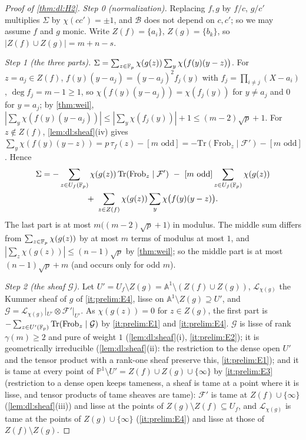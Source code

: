 \begin{proof}[Proof of \cref{thm:dl:H2}]
\emph{Step 0 (normalization).} Replacing $f,g$ by $f/c$, $g/c'$ multiplies
$\Sigma$ by $\chi(cc')=\pm1$, and $\mathcal B$ does not depend on $c,c'$; so we
may assume $f$ and $g$ monic. Write $Z(f)=\{a_i\}$, $Z(g)=\{b_k\}$, so
$|Z(f)\cup Z(g)|=m+n-s$.

\emph{Step 1 (the three parts).}
$\Sigma=\sum_{z\in\mathbb F_p}\chi(g(z))\sum_y\chi\big(f(y)(y-z)\big)$. For
$z=a_j\in Z(f)$, $f(y)(y-a_j)=(y-a_j)^2f_j(y)$ with
$f_j=\prod_{i\ne j}(X-a_i)$, $\deg f_j=m-1\ge1$, so
$\chi(f(y)(y-a_j))=\chi(f_j(y))$ for $y\ne a_j$ and $0$ for $y=a_j$; by
\cref{thm:weil},
$|\sum_y\chi(f(y)(y-a_j))|\le|\sum_y\chi(f_j(y))|+1\le(m-2)\sqrt p+1$. For
$z\notin Z(f)$, \cref{lem:dl:sheaf}(iv) gives
$\sum_y\chi(f(y)(y-z))=p\,\tau_f(z)-[m\text{ odd}]
=-\mathrm{Tr}(\mathrm{Frob}_z\mid\mathcal F')-[m\text{ odd}]$. Hence
\begin{multline*}
  \Sigma=-\sum_{z\in U_f(\mathbb F_p)}\chi(g(z))\,\mathrm{Tr}(\mathrm{Frob}_z\mid\mathcal F')
  \ -\ [m\text{ odd}]\sum_{z\in U_f(\mathbb F_p)}\chi(g(z))\\
  +\ \sum_{z\in Z(f)}\chi(g(z))\sum_y\chi\big(f(y)(y-z)\big).
\end{multline*}
The last part is at most $m\big((m-2)\sqrt p+1\big)$ in modulus. The middle sum
differs from $\sum_{z\in\mathbb F_p}\chi(g(z))$ by at most $m$ terms of modulus at most
$1$, and $|\sum_z\chi(g(z))|\le(n-1)\sqrt p$ by \cref{thm:weil}; so the middle
part is at most $(n-1)\sqrt p+m$ (and occurs only for odd $m$).

\emph{Step 2 (the sheaf $\mathcal G$).} Let
$U'=U_f\setminus Z(g)=\mathbb A^1\setminus(Z(f)\cup Z(g))$,
$\mathcal L_{\chi(g)}$ the Kummer sheaf of $g$ of \ref{it:prelim:E4}, lisse on
$\mathbb A^1\setminus Z(g)\supseteq U'$, and
$\mathcal G=\mathcal L_{\chi(g)}|_{U'}\otimes\mathcal F'|_{U'}$. As $\chi(g(z))=0$
for $z\in Z(g)$, the first part is
$-\sum_{z\in U'(\mathbb F_p)}\mathrm{Tr}(\mathrm{Frob}_z\mid\mathcal G)$ by
\ref{it:prelim:E1} and \ref{it:prelim:E4}. $\mathcal G$ is lisse of rank
$\gamma(m)\ge2$ and pure of weight $1$ (\cref{lem:dl:sheaf}(i),
\ref{it:prelim:E2}); it is geometrically irreducible (\cref{lem:dl:sheaf}(ii):
the restriction to the dense open $U'$ and the tensor product with a rank-one
sheaf preserve this, \ref{it:prelim:E1}); and it is tame at every point of
$\mathbb P^1\setminus U'=Z(f)\cup Z(g)\cup\{\infty\}$ by \ref{it:prelim:E3}
(restriction to a dense open keeps tameness, a sheaf is tame at a point where it
is lisse, and tensor products of tame sheaves are tame): $\mathcal F'$ is tame at
$Z(f)\cup\{\infty\}$ (\cref{lem:dl:sheaf}(iii)) and lisse at the points of
$Z(g)\setminus Z(f)\subseteq U_f$, and $\mathcal L_{\chi(g)}$ is tame at the
points of $Z(g)\cup\{\infty\}$ (\ref{it:prelim:E4}) and lisse at those of
$Z(f)\setminus Z(g)$.


\end{proof}
